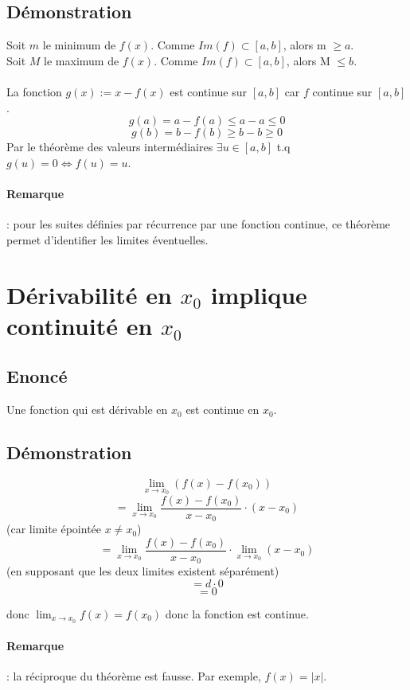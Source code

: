 \documentclass{article}
\begin{document}
\subsection{Démonstration}

Soit $ m $ le minimum de $ f(x) $. Comme $ Im(f) \subset [a, b] $, alors m $ \geq a $.\\
Soit $ M $ le maximum de $ f(x) $. Comme $ Im(f) \subset [a, b] $, alors M $ \leq b $.\\\\
La fonction $ g(x) := x - f(x) $ est continue sur $ [a, b] $ car $ f $ continue sur $ [a, b] $.
\[ g(a) = a - f(a) \leq a - a \leq 0 \]
\[ g(b) = b - f(b) \geq b - b \geq 0 \]
Par le théorème des valeurs intermédiaires $ \exists u \in [a, b] $ t.q $ g(u) = 0 \Leftrightarrow f(u) = u $.

\paragraph{Remarque}: pour les suites définies par récurrence par une fonction continue, ce théorème permet d'identifier les limites éventuelles.

\newpage

\section{Dérivabilité en $x_0$ implique continuité en $x_0$}

\subsection{Enoncé}

Une fonction qui est dérivable en $x_0$ est continue en $x_0$.

\subsection{Démonstration}

\[ \lim_{x\to{x_0}} (f(x) - f(x_0)) \]
\[ = \lim_{x\to{x_0}} \frac{f(x) - f(x_0)}{x-{x_0}} \cdot (x-{x_0}) \] (car limite épointée $ x \neq x_0 $)
\[ = \lim_{x\to{x_0}} \frac{f(x) - f(x_0)}{x-{x_0}} \cdot \lim_{x\to{x_0}} (x-{x_0})\] (en supposant que les deux limites existent séparément)
\[ = d \cdot 0 \]
\[ = 0 \]

donc $ \lim_{x\to{x_0}} f(x) = f(x_0) $ donc la fonction est continue.
\paragraph{Remarque}: la réciproque du théorème est fausse. Par exemple, $ f(x) = |x| $.
\end{document}

